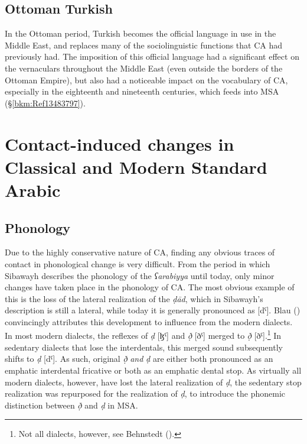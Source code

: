 \documentclass[output=paper]{langsci/langscibook}
\begin{document}
\subsection{Ottoman Turkish}

In the Ottoman period,  {Turkish} becomes the official language in use in the Middle East, and replaces many of the sociolinguistic functions that CA had previously had. The {imposition} of this official language had a significant effect on the  vernaculars throughout the Middle East (even outside the borders of the Ottoman Empire), but also had a noticeable impact on the vocabulary of CA, especially in the eighteenth and nineteenth centuries, which feeds into MSA (§\ref{bkm:Ref13483797}).

\section{Contact-induced changes in Classical and Modern Standard Arabic}
\subsection{\label{bkm:Ref12953419}Phonology}

Due to the highly conservative nature of CA, finding any obvious traces of contact in phonological change is very difficult. From the period in which Sibawayh describes the phonology of the \textit{ʕarabiyya} until today, only minor changes have taken place in the phonology of CA. The most obvious example of this is the loss of the lateral realization of the \textit{ḍād}, which in Sibawayh’s description is still a lateral, while today it is generally pronounced as [dˤ]. Blau (\citeyear[162--163]{Blau1969}) convincingly attributes this development to influence from the modern dialects. In most modern  dialects, the reflexes of \textit{ḍ} [ɮˤ] and \textit{ð̣} [ðˤ] {merged} to \textit{ð̣} [ðˤ].\footnote{Not all dialects, however, see Behnstedt (\citeyear[16ff.]{Behnstedt2016Yemen}).} In sedentary dialects that lose the interdentals, this {merged} sound subsequently shifts to \textit{ḍ} [dˤ]. As such, original \textit{ð̣} \textit{and} \textit{ḍ} are either both pronounced as an {emphatic} interdental fricative or both as an {emphatic} dental stop. As virtually all modern dialects, however, have lost the lateral realization of \textit{ḍ}, the sedentary stop realization was repurposed for the realization of \textit{ḍ}, to introduce the phonemic distinction between \textit{ð̣} and \textit{ḍ} in MSA.
\end{document}
